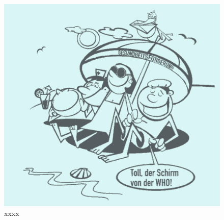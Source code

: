 \begin{figure}
	\vfill
	\centering
		\includegraphics{schirm.jpg}
	\caption{xxxx}
	\label{fig:schirm}
	\vfill
\end{figure}
